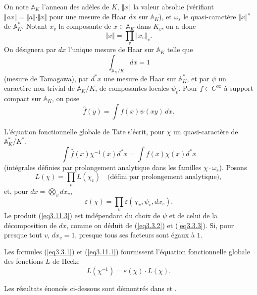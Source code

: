 \documentclass[11pt,a4paper]{amsart}
\theoremstyle{plain}
\theoremstyle{definition}
\newcommand{\dbA}{\mathbb{A}}
\newenvironment{para}{\par\noindent}{\par}
\newcommand{\eps}{\varepsilon}
\newcommand{\wh}{\widehat}
\newcommand{\vl}{\Vert}
\newcommand{\vr}{\Vert}
\begin{document}
\begin{para}
On note $\dbA_{K}$ l'anneau des ad\`eles de $K$, $\vl x \vr$ la valeur absolue (v\'erifiant $\vl ax \vr = \vl a \vr \cdot \vl x \vr$ pour une mesure de Haar $dx$ sur $\dbA_{K}$), et $\omega_{s}$ le quasi-caract\`ere $\vl x \vr^{s}$ de $\dbA_{K}^{*}$. Notant $x_{v}$ la composante de $x \in \dbA_{K}$ dans $K_{v}$, on a donc
\[
\vl x \vr = \prod_{v} \vl x_{v} \vr_{v}.
\]
On d\'esignera par $dx$ l'unique mesure de Haar sur $\dbA_{K}$ telle que
\[
\int_{\dbA_{K}/K} dx = 1
\]
(mesure de Tamagawa), par $d^{*}x$ une mesure de Haar sur $\dbA_{K}^{*}$, et par $\psi$ un caract\`ere non trivial de $\dbA_{K}/K$, de composantes locales $\psi_{v}$. Pour $f \in C^{\infty}$ \`a support compact sur $\dbA_{K}$, on pose
\[
\wh{f}(y) = \int f(x) \psi(xy)\, dx.
\]
\end{para}

\begin{para}
L'\'equation fonctionnelle globale de Tate \cite{14} s'\'ecrit, pour $\chi$ un quasi-caract\`ere de $\dbA_{K}^{*}/K^{*}$,
\begin{equation}\label{eq3.11.1}
\int \wh{f}(x) \chi^{-1}(x) d^{*}x = \int f(x) \chi(x) d^{*}x
\end{equation}
(int\'egrales d\'efinies par prolongement analytique dans les familles $\chi \cdot \omega_{s}$). Posons
\begin{equation}\label{eq3.11.2}
L(\chi) = \prod_{v} L(\chi_{v}) \quad \text{(d\'efini par prolongement analytique)},
\end{equation}
et, pour $dx = \bigotimes_{v} dx_{v}$,
\begin{equation}\label{eq3.11.3}
\eps(\chi) = \prod_{v} \eps(\chi_{v}, \psi_{v}, dx_{v}).
\end{equation}
Le produit (\ref{eq3.11.3}) est ind\'ependant du choix de $\psi$ et de celui de la d\'ecomposition de $dx$, comme on d\'eduit de (\ref{eq3.3.2}) et (\ref{eq3.3.3}). Si, pour presque tout $v$, $dx_{v} = 1$, presque tous ses facteurs sont \'egaux \`a $1$.
\end{para}

Les formules (\ref{eq3.3.1}) et (\ref{eq3.11.1}) fournissent l'\'equation fonctionnelle globale des fonctions $L$ de Hecke
\begin{equation}\label{eq3.11.4}
L(\chi^{-1}) = \eps(\chi) \cdot L(\chi).
\end{equation}

\begin{para}
Les r\'esultats \'enonc\'es ci-dessous sont d\'emontr\'es dans \cite{1} et \cite{19}.
\end{para}
\end{document}
